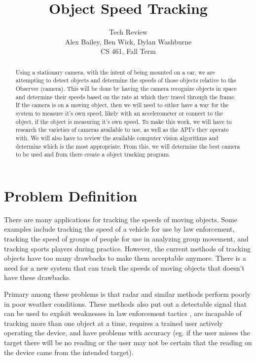 \documentclass[letterpaper,10pt,onecolumn,draftclsnofoot]{IEEEtran}
\title{Object Speed Tracking}
\author{Tech Review\\Alex Bailey, Ben Wick, Dylan Washburne\\CS 461, Fall Term}
\begin{document}
\begin{titlepage}

\maketitle

\begin{abstract}
Using a stationary camera, with the intent of being mounted on a car, we are attempting to  detect objects and determine the speeds of those objects relative to the Observer (camera).
This will be done by having the camera recognize objects in space and determine their speeds based on the rate at which they travel through the frame.
If the camera is on a moving object, then we will need to either have a way for the system to measure it's own speed, likely with an accelerometer or connect to the object, if the object is measuring it's own speed.
To make this work, we will have to research the varieties of cameras available to use, as well as the API’s  they operate with.
We will also have to review the available computer vision algorithms and determine which is the most appropriate.
From this, we will determine the best camera to be used and from there create a object tracking program.
 
\end{abstract}

\end{titlepage}

\section{Problem Definition}

There are many applications for tracking the speeds of moving objects.
Some examples include tracking the speed of a vehicle for use by law enforcement, tracking the speed of groups of people for use in analyzing group movement, and tracking sports players during practice.
However, the current methods of tracking objects have too many drawbacks to make them acceptable anymore. 
There is a need for a new system that can track the speeds of moving objects that doesn't have these drawbacks.


Primary among these problems is that radar and similar methods perform poorly in poor weather conditions.
These methods also put out a detectable signal that can be used to exploit weaknesses in law enforcement tactics , are incapable of tracking more than one object at a time, requires a trained user actively operating the device, and have problems with accuracy (eg. if the user misses the target there will be no reading or the user may not be certain that the reading on the device came from the intended target).
\end{document}
